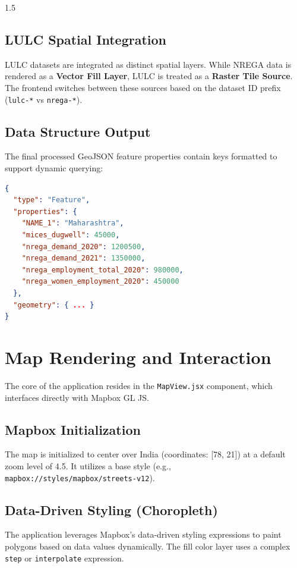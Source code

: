 \documentclass[12pt,a4paper]{report}
\begin{document}
\begin{spacing}{1.5}
\section{LULC Spatial Integration}
LULC datasets are integrated as distinct spatial layers. While NREGA data is rendered as a \textbf{Vector Fill Layer}, LULC is treated as a \textbf{Raster Tile Source}. The frontend switches between these sources based on the dataset ID prefix (\texttt{lulc-*} vs \texttt{nrega-*}).

\section{Data Structure Output}
The final processed GeoJSON feature properties contain keys formatted to support dynamic querying:
\begin{lstlisting}[language=json, caption={Sample Processed GeoJSON Properties}]
{
  "type": "Feature",
  "properties": {
    "NAME_1": "Maharashtra",
    "mices_dugwell": 45000,
    "nrega_demand_2020": 1200500,
    "nrega_demand_2021": 1350000,
    "nrega_employment_total_2020": 980000,
    "nrega_women_employment_2020": 450000
  },
  "geometry": { ... }
}
\end{lstlisting}

\chapter{Map Rendering and Interaction}

The core of the application resides in the \texttt{MapView.jsx} component, which interfaces directly with Mapbox GL JS.

\section{Mapbox Initialization}
The map is initialized to center over India (coordinates: [78, 21]) at a default zoom level of 4.5. It utilizes a base style (e.g., \texttt{mapbox://styles/mapbox/streets-v12}).

\section{Data-Driven Styling (Choropleth)}
The application leverages Mapbox's data-driven styling expressions to paint polygons based on data values dynamically. 
The fill color layer uses a complex \texttt{step} or \texttt{interpolate} expression.


\end{spacing}
\end{document}
